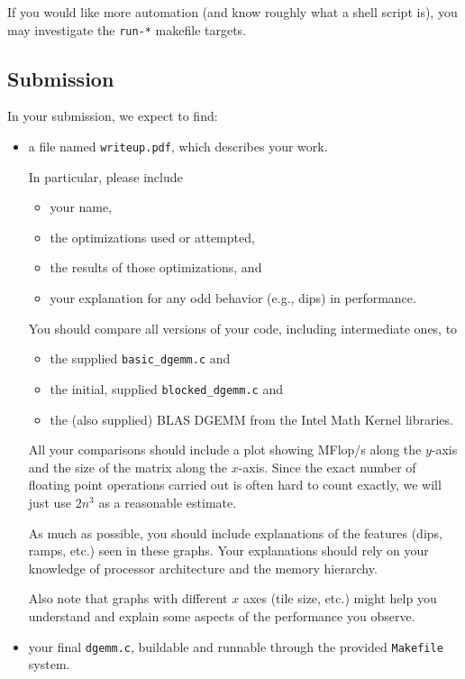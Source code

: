 \documentclass[11pt]{article}
\begin{document}
If you would like more automation (and know roughly what a shell
script is), you may investigate the \texttt{run-*} makefile targets.

\subsection*{Submission}

In your submission, we expect to find:

\begin{itemize}
  \item a file named \texttt{writeup.pdf}, which describes your work.

  In particular, please include
  \begin{itemize}
    \item your name,
    \item the optimizations used or attempted,
    \item the results of those optimizations, and
    \item your explanation for any odd behavior (e.g., dips) in performance.
  \end{itemize}

  You should compare all versions of your code, including intermediate
  ones, to
  \begin{itemize}
    \item the supplied \verb|basic_dgemm.c| and 
    \item the initial, supplied \verb|blocked_dgemm.c| and 
    \item the (also supplied) BLAS DGEMM from the
      Intel Math Kernel libraries. 
  \end{itemize}

  All your comparisons should include a plot showing MFlop/s along the
  $y$-axis and the size of the matrix along the $x$-axis. Since the
  exact number of floating point operations carried out is often hard
  to count exactly, we will just use $2n^3$ as a reasonable estimate.

  As much as possible, you should include explanations of the features
  (dips, ramps, etc.) seen in these graphs. Your explanations should
  rely on your knowledge of processor architecture and the memory
  hierarchy.

  Also note that graphs with different $x$ axes (tile size, etc.)
  might help you understand and explain some aspects of the
  performance you observe.

  \item your final \verb|dgemm.c|, buildable and runnable through the
  provided \texttt{Makefile} system.
\end{itemize}
\end{document}
